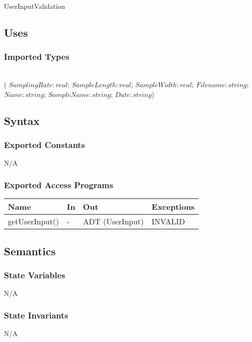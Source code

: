 \documentclass[12pt, titlepage]{article}
\begin{document}
UserInputValidation

\subsection{Uses}

\subsubsection{Imported Types}

 \\
( $SamplingRate: real$; $SampleLength: real$; $SampleWidth: real$; $Filename: string$; $Name: string$; $SampleName: string$; $Date: string$)

\subsection{Syntax}

\subsubsection{Exported Constants}
N/A

\subsubsection{Exported Access Programs}

\begin{center}
\begin{tabular}{p{4cm} p{2cm} p{6cm} p{2cm}}
\hline
\textbf{Name} & \textbf{In} & \textbf{Out} & \textbf{Exceptions} \\
\hline
getUserInput() & - & ADT (UserInput) & INVALID \\
\hline
\end{tabular}
\end{center}

\subsection{Semantics}

\subsubsection{State Variables}
N/A

\subsubsection{State Invariants}
N/A
\end{document}
